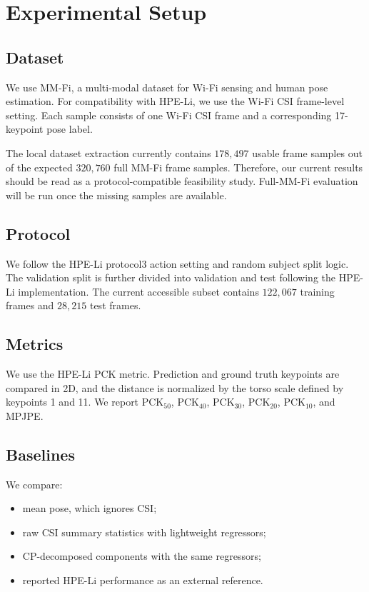 \documentclass[letterpaper]{article}
\begin{document}
\section{Experimental Setup}

\subsection{Dataset}

We use MM-Fi, a multi-modal dataset for Wi-Fi sensing and human pose estimation. For compatibility with HPE-Li, we use the Wi-Fi CSI frame-level setting. Each sample consists of one Wi-Fi CSI frame and a corresponding 17-keypoint pose label.

The local dataset extraction currently contains $178{,}497$ usable frame samples out of the expected $320{,}760$ full MM-Fi frame samples. Therefore, our current results should be read as a protocol-compatible feasibility study. Full-MM-Fi evaluation will be run once the missing samples are available.

\subsection{Protocol}

We follow the HPE-Li protocol3 action setting and random subject split logic. The validation split is further divided into validation and test following the HPE-Li implementation. The current accessible subset contains $122{,}067$ training frames and $28{,}215$ test frames.

\subsection{Metrics}

We use the HPE-Li PCK metric. Prediction and ground truth keypoints are compared in 2D, and the distance is normalized by the torso scale defined by keypoints 1 and 11. We report PCK$_{50}$, PCK$_{40}$, PCK$_{30}$, PCK$_{20}$, PCK$_{10}$, and MPJPE.

\subsection{Baselines}

We compare:
\begin{itemize}
    \item mean pose, which ignores CSI;
    \item raw CSI summary statistics with lightweight regressors;
    \item CP-decomposed components with the same regressors;
    \item reported HPE-Li performance as an external reference.
\end{itemize}
\end{document}
